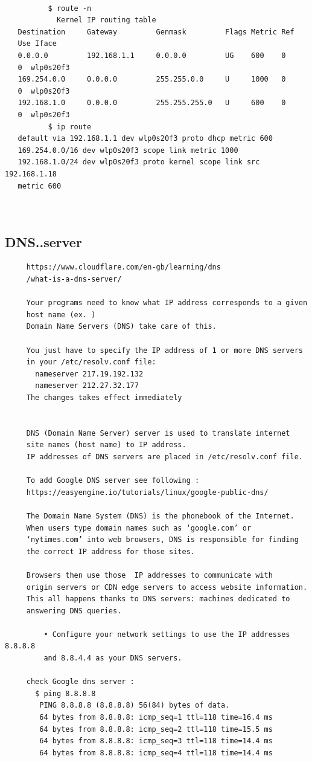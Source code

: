 \documentclass[a4paper,12pt]{article}
\begin{document}
\begin{verbatim}
          
          $ route -n
            Kernel IP routing table
   Destination     Gateway         Genmask         Flags Metric Ref    
   Use Iface
   0.0.0.0         192.168.1.1     0.0.0.0         UG    600    0        
   0  wlp0s20f3
   169.254.0.0     0.0.0.0         255.255.0.0     U     1000   0        
   0  wlp0s20f3
   192.168.1.0     0.0.0.0         255.255.255.0   U     600    0        
   0  wlp0s20f3
          $ ip route
   default via 192.168.1.1 dev wlp0s20f3 proto dhcp metric 600 
   169.254.0.0/16 dev wlp0s20f3 scope link metric 1000 
   192.168.1.0/24 dev wlp0s20f3 proto kernel scope link src 192.168.1.18
   metric 600 

    
\end{verbatim}


\subsection{DNS..server}
\begin{verbatim}
     https://www.cloudflare.com/en-gb/learning/dns
     /what-is-a-dns-server/
     
     Your programs need to know what IP address corresponds to a given 
     host name (ex. )
     Domain Name Servers (DNS) take care of this.

     You just have to specify the IP address of 1 or more DNS servers
     in your /etc/resolv.conf file:
       nameserver 217.19.192.132
       nameserver 212.27.32.177
     The changes takes effect immediately
     
     
     DNS (Domain Name Server) server is used to translate internet 
     site names (host name) to IP address.
     IP addresses of DNS servers are placed in /etc/resolv.conf file.
     
     To add Google DNS server see following :
     https://easyengine.io/tutorials/linux/google-public-dns/
     
     The Domain Name System (DNS) is the phonebook of the Internet.
     When users type domain names such as ‘google.com’ or 
     ‘nytimes.com’ into web browsers, DNS is responsible for finding
     the correct IP address for those sites. 
     
     Browsers then use those  IP addresses to communicate with
     origin servers or CDN edge servers to access website information.
     This all happens thanks to DNS servers: machines dedicated to
     answering DNS queries.  
   
         • Configure your network settings to use the IP addresses 8.8.8.8 
         and 8.8.4.4 as your DNS servers.
﻿
     check Google dns server : 
       $ ping 8.8.8.8
        PING 8.8.8.8 (8.8.8.8) 56(84) bytes of data.
        64 bytes from 8.8.8.8: icmp_seq=1 ttl=118 time=16.4 ms
        64 bytes from 8.8.8.8: icmp_seq=2 ttl=118 time=15.5 ms
        64 bytes from 8.8.8.8: icmp_seq=3 ttl=118 time=14.4 ms
        64 bytes from 8.8.8.8: icmp_seq=4 ttl=118 time=14.4 ms 
      
\end{verbatim}
\end{document}
